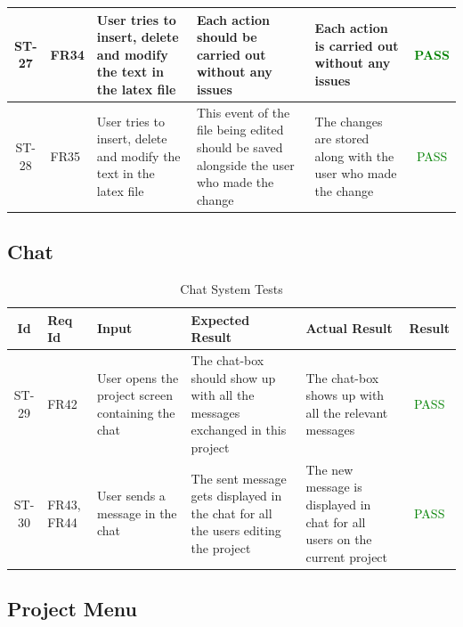\documentclass[12pt, titlepage]{article}
\begin{document}
\begin{center}
\begin{longtable}{|c|p{1cm}|p{2.7cm}|p{3cm}|p{3cm}|c|}
        \hline
        ST-27 & FR34 & User tries to insert, delete and modify the text in the latex file & Each action should be carried out without any issues & Each action is carried out without any issues & \textcolor{green}{PASS} \\
        \hline
        ST-28 & FR35 & User tries to insert, delete and modify the text in the latex file & This event of the file being edited should be saved alongside the user who made the change & The changes are stored along with the user who made the change & \textcolor{green}{PASS} \\
        \hline
    \end{longtable}
\end{center}

\subsection{Chat}

\begin{center}
    \begin{longtable}{|c|p{1cm}|p{2.7cm}|p{3cm}|p{3cm}|c|}
        \caption{Chat System Tests \label{long}}\\
        \hline
        \textbf{Id} & \textbf{Req Id} & \textbf{Input} & \textbf{Expected Result} & \textbf{Actual Result} & \textbf{Result}   \\
        \hline
        ST-29 & FR42 & User opens the project screen containing the chat & The chat-box should show up with all the messages exchanged in this project & The chat-box shows up with all the relevant messages &  \textcolor{green}{PASS} \\
        \hline
        ST-30 & FR43, FR44 & User sends a message in the chat & The sent message gets displayed in the chat for all the users editing the project & The new message is displayed in chat for all users on the current project &  \textcolor{green}{PASS} \\
        \hline
    \end{longtable}
\end{center}

\subsection{Project Menu}
\end{document}
